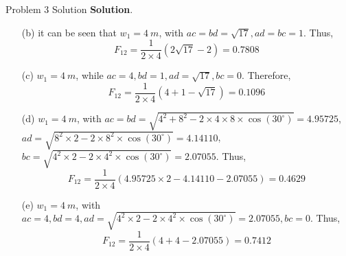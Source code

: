 \documentclass[9pt, aspectratio=169, handout]{beamer}
\begin{document}
\begin{frame}{Problem 3 Solution}
    \textbf{Solution}.
    \begin{itemize}
        \item[(b)] it can be seen that $w_1 = \SI{4}{m}$, with $ac = bd = \sqrt{17}, ad = bc = 1$. Thus,
            $$
            F_{12} = \frac{1}{2 \times 4} \left(2\sqrt{17} - 2\right) = 0.7808
            $$
        \item[(c)] $w_1 = \SI{4}{m}$, while $ac = 4, bd = 1, ad = \sqrt{17}, bc = 0$. Therefore,
            $$
            F_{12} = \frac{1}{2 \times 4} \left(4 + 1 - \sqrt{17}\right) = 0.1096
            $$
        \item[(d)] $w_1 = \SI{4}{m}$, with $ac = bd = \sqrt{4^2 + 8^2 - 2\times 4\times 8 \times \cos(30^\circ)} = 4.95725$, $ad = \sqrt{8^2\times 2 - 2 \times 8^2\times \cos (30^\circ)} = 4.14110$, $bc = \sqrt{4^2\times 2 - 2 \times 4^2\times \cos (30^\circ)} = 2.07055$. Thus,
            $$
            F_{12} = \frac{1}{2\times 4} \left(4.95725\times 2 - 4.14110 - 2.07055\right) = 0.4629
            $$
        \item[(e)] $w_1 = \SI{4}{m}$, with $ac = 4, bd = 4, ad = \sqrt{4^2\times 2 - 2 \times 4^2\times \cos (30^\circ)} = 2.07055, bc = 0$. Thus,
            $$
            F_{12} = \frac{1}{2\times 4} \left(4 + 4 - 2.07055\right) = 0.7412
            $$
    \end{itemize}
    \hfill\qedsymbol
\end{frame}
\end{document}
